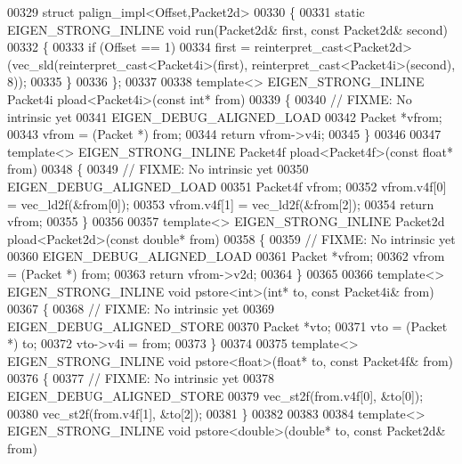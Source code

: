 \begin{DoxyCode}
{00329 \textcolor{keyword}{struct }palign\_impl<Offset,Packet2d>
00330 \{
00331   \textcolor{keyword}{static} EIGEN\_STRONG\_INLINE \textcolor{keywordtype}{void} run(Packet2d& first, \textcolor{keyword}{const} Packet2d& second)
00332   \{
00333     \textcolor{keywordflow}{if} (Offset == 1)
00334       first = \textcolor{keyword}{reinterpret\_cast<}Packet2d\textcolor{keyword}{>}(vec\_sld(reinterpret\_cast<Packet4i>(first), 
      reinterpret\_cast<Packet4i>(second), 8));
00335   \}
00336 \};
00337 
00338 \textcolor{keyword}{template}<> EIGEN\_STRONG\_INLINE Packet4i pload<Packet4i>(\textcolor{keyword}{const} \textcolor{keywordtype}{int}*     from)
00339 \{
00340   \textcolor{comment}{// FIXME: No intrinsic yet}
00341   EIGEN\_DEBUG\_ALIGNED\_LOAD
00342   Packet *vfrom;
00343   vfrom = (Packet *) from;
00344   \textcolor{keywordflow}{return} vfrom->v4i;
00345 \}
00346 
00347 \textcolor{keyword}{template}<> EIGEN\_STRONG\_INLINE Packet4f pload<Packet4f>(\textcolor{keyword}{const} \textcolor{keywordtype}{float}*   from)
00348 \{
00349   \textcolor{comment}{// FIXME: No intrinsic yet}
00350   EIGEN\_DEBUG\_ALIGNED\_LOAD
00351   Packet4f vfrom;
00352   vfrom.v4f[0] = vec\_ld2f(&from[0]);
00353   vfrom.v4f[1] = vec\_ld2f(&from[2]);
00354   \textcolor{keywordflow}{return} vfrom;
00355 \}
00356 
00357 \textcolor{keyword}{template}<> EIGEN\_STRONG\_INLINE Packet2d pload<Packet2d>(\textcolor{keyword}{const} \textcolor{keywordtype}{double}* from)
00358 \{
00359   \textcolor{comment}{// FIXME: No intrinsic yet}
00360   EIGEN\_DEBUG\_ALIGNED\_LOAD
00361   Packet *vfrom;
00362   vfrom = (Packet *) from;
00363   \textcolor{keywordflow}{return} vfrom->v2d;
00364 \}
00365 
00366 \textcolor{keyword}{template}<> EIGEN\_STRONG\_INLINE \textcolor{keywordtype}{void} pstore<int>(\textcolor{keywordtype}{int}*       to, \textcolor{keyword}{const} Packet4i& from)
00367 \{
00368   \textcolor{comment}{// FIXME: No intrinsic yet}
00369   EIGEN\_DEBUG\_ALIGNED\_STORE
00370   Packet *vto;
00371   vto = (Packet *) to;
00372   vto->v4i = from;
00373 \}
00374 
00375 \textcolor{keyword}{template}<> EIGEN\_STRONG\_INLINE \textcolor{keywordtype}{void} pstore<float>(\textcolor{keywordtype}{float}*   to, \textcolor{keyword}{const} Packet4f& from)
00376 \{
00377   \textcolor{comment}{// FIXME: No intrinsic yet}
00378   EIGEN\_DEBUG\_ALIGNED\_STORE
00379   vec\_st2f(from.v4f[0], &to[0]);
00380   vec\_st2f(from.v4f[1], &to[2]);
00381 \}
00382 
00383 
00384 \textcolor{keyword}{template}<> EIGEN\_STRONG\_INLINE \textcolor{keywordtype}{void} pstore<double>(\textcolor{keywordtype}{double}*   to, \textcolor{keyword}{const} Packet2d& from)
}
\end{DoxyCode}
